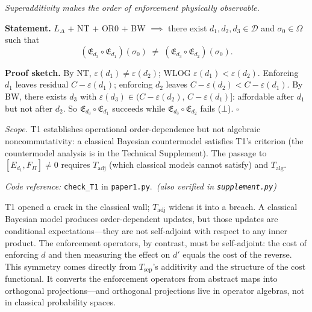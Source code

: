 \documentclass[11pt]{article}
\theoremstyle{remark}
\newcommand{\coderef}[2]{\smallskip\noindent\textit{Code reference:} \texttt{#1} in \texttt{#2}.}
\begin{document}
\begin{tcolorbox}[apfbox, title={Theorem T1 --- The Bridge Theorem (Order-Dependence)}]
\textit{Superadditivity makes the order of enforcement physically observable.}

\smallskip\noindent\textbf{Statement.}  $L_\Delta$ + NT + OR0 + BW $\implies$ there exist $d_1, d_2, d_3 \in \mathcal{D}$ and $\sigma_0 \in \Omega$ such that
\[
(\mathfrak{E}_{d_3} \circ \mathfrak{E}_{d_1})(\sigma_0) \;\ne\; (\mathfrak{E}_{d_3} \circ \mathfrak{E}_{d_2})(\sigma_0).
\]

\smallskip\noindent\textbf{Proof sketch.}  By NT, $\varepsilon(d_1) \ne \varepsilon(d_2)$; WLOG $\varepsilon(d_1) < \varepsilon(d_2)$.  Enforcing $d_1$ leaves residual $C - \varepsilon(d_1)$; enforcing $d_2$ leaves $C - \varepsilon(d_2) < C - \varepsilon(d_1)$.  By BW, there exists $d_3$ with $\varepsilon(d_3) \in (C - \varepsilon(d_2),\, C - \varepsilon(d_1)]$: affordable after $d_1$ but not after $d_2$.  So $\mathfrak{E}_{d_3} \circ \mathfrak{E}_{d_1}$ succeeds while $\mathfrak{E}_{d_3} \circ \mathfrak{E}_{d_2}$ fails ($\bot$).  \hfill$\square$
\label{prop:CME}

\smallskip\noindent\textit{Scope.}  T1 establishes operational order-dependence but not algebraic noncommutativity: a classical Bayesian countermodel satisfies T1's criterion (the countermodel analysis is in the Technical Supplement).  The passage to $[E_{d_1}, F_\Pi] \ne 0$ requires $T_{\mathrm{adj}}$ (which classical models cannot satisfy) and $T_{\mathrm{alg}}$.

\coderef{check\_T1}{paper1.py}\,%
\hspace{1em}\textit{(also verified in \texttt{supplement.py})}
\end{tcolorbox}

\smallskip\noindent T1 opened a crack in the classical wall; $T_{\mathrm{adj}}$ widens it into a breach.  A classical Bayesian model produces order-dependent updates, but those updates are conditional expectations---they are not self-adjoint with respect to any inner product.  The enforcement operators, by contrast, must be self-adjoint: the cost of enforcing $d$ and then measuring the effect on $d'$ equals the cost of the reverse.  This symmetry comes directly from $T_{\mathrm{sep}}$'s additivity and the structure of the cost functional.  It converts the enforcement operators from abstract maps into orthogonal projections---and orthogonal projections live in operator algebras, not in classical probability spaces.
\end{document}
